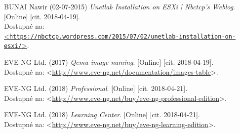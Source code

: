 \begin{thebibliography}{99}
BUNAI Nawir (02-07-2015) {\it Unetlab Installation on ESXi | Nbctcp's Weblog}. [Online] [cit. 2018-04-19]. \\
Dostupné na:\\
\href{https://nbctcp.wordpress.com/2015/07/02/unetlab-installation-on-esxi/}{<\texttt{https://nbctcp.wordpress.com/2015/07/02/unetlab-installation-on-esxi/}>}.

EVE-NG Ltd. (2017) {\it Qemu image naming}. [Online] [cit. 2018-04-19]. \\
Dostupné na: <\url{http://www.eve-ng.net/documentation/images-table}>.

EVE-NG Ltd. (2018) {\it Professional}. [Online] [cit. 2018-04-21]. \\
Dostupné na: <\url{http://www.eve-ng.net/buy/eve-ng-professional-edition}>.

EVE-NG Ltd. (2018) {\it Learning Center}. [Online] [cit. 2018-04-21]. \\
Dostupné na: <\url{http://www.eve-ng.net/buy/eve-ng-learning-edition}>.

\end{thebibliography}